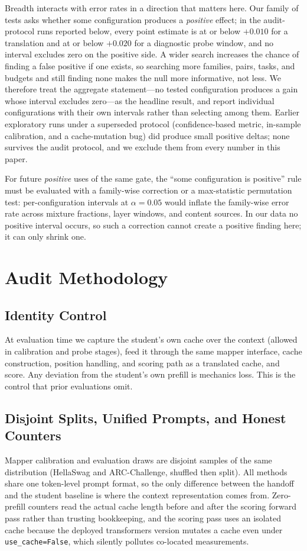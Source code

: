 \documentclass{article} %
\begin{document}
Breadth interacts with error rates in a direction that matters here. Our family
of tests asks whether some configuration produces a \emph{positive} effect; in
the audit-protocol runs reported below, every point estimate is at or below
$+0.010$ for a translation and at or below $+0.020$ for a diagnostic probe
window, and no interval excludes zero on the positive side. A wider search
increases the chance of finding a false positive if one exists, so searching
more families, pairs, tasks, and budgets and still finding none makes the null
more informative, not less. We therefore treat the aggregate statement---no
tested configuration produces a gain whose interval excludes zero---as the
headline result, and report individual configurations with their own intervals
rather than selecting among them. Earlier exploratory runs under a superseded
protocol (confidence-based metric, in-sample calibration, and a cache-mutation
bug) did produce small positive deltas; none survives the audit protocol, and
we exclude them from every number in this paper.

For future \emph{positive} uses of the same gate, the ``some configuration is
positive'' rule must be evaluated with a family-wise correction or a
max-statistic permutation test: per-configuration intervals at
$\alpha{=}0.05$ would inflate the family-wise error rate across mixture
fractions, layer windows, and content sources. In our data no positive interval
occurs, so such a correction cannot create a positive finding here; it can only
shrink one.

\section{Audit Methodology}
\label{sec:method}

\subsection{Identity Control}
At evaluation time we capture the student's own cache over the context
(allowed in calibration and probe stages), feed it through the same mapper
interface, cache construction, position handling, and scoring path as a
translated cache, and score. Any deviation from the student's own prefill is
mechanics loss. This is the control that prior evaluations omit.

\subsection{Disjoint Splits, Unified Prompts, and Honest Counters}
Mapper calibration and evaluation draws are disjoint samples of the same
distribution (HellaSwag and ARC-Challenge, shuffled then split). All methods
share one token-level prompt format, so the only difference between the
handoff and the student baseline is where the context representation comes
from. Zero-prefill counters read the actual cache length before and after the
scoring forward pass rather than trusting bookkeeping, and the scoring pass
uses an isolated cache because the deployed transformers version mutates a
cache even under \texttt{use\_cache=False}, which silently pollutes
co-located measurements.
\end{document}
